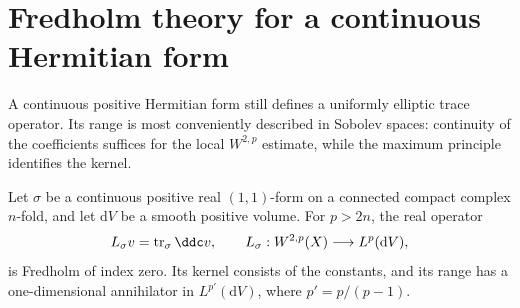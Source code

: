 \section{Fredholm theory for a continuous Hermitian form}
\label{sec:continuous-hermitian-fredholm}

A continuous positive Hermitian form still defines a uniformly elliptic
trace operator. Its range is most conveniently described in Sobolev spaces:
continuity of the coefficients suffices for the local $W^{2,p}$ estimate,
while the maximum principle identifies the kernel.

\begin{lemma}\label{lem:continuous-hermitian-fredholm}
Let $\sigma$ be a continuous positive real $(1,1)$-form on a connected
compact complex $n$-fold, and let $\mathrm dV$ be a smooth positive volume.
For $p>2n$, the real operator
\[
 L_\sigma v=\operatorname{tr}_\sigma\ddc v,
 \qquad L_\sigma:W^{2,p}(X)\longrightarrow L^p(\mathrm dV),
\]
is Fredholm of index zero. Its kernel consists of the constants, and
its range has a one-dimensional annihilator in $L^{p'}(\mathrm dV)$,
where $p'=p/(p-1)$.
\end{lemma}
